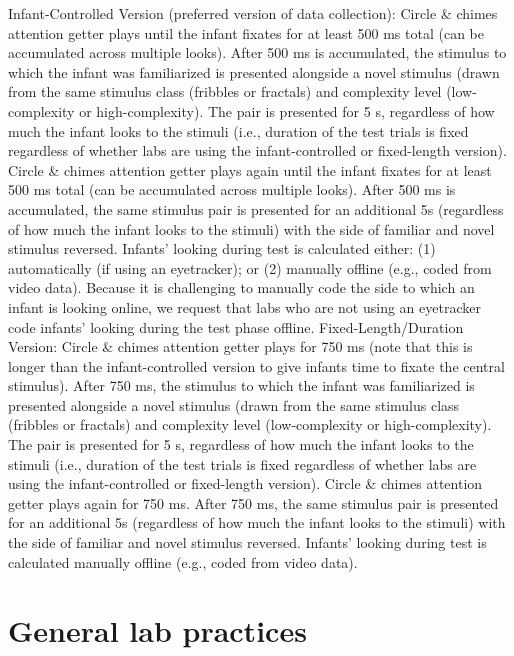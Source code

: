 \documentclass[
]{book}
\begin{document}
Infant-Controlled Version (preferred version of data collection):
Circle \& chimes attention getter plays until the infant fixates for at least 500 ms total (can be accumulated across multiple looks).
After 500 ms is accumulated, the stimulus to which the infant was familiarized is presented alongside a novel stimulus (drawn from the same stimulus class (fribbles or fractals) and complexity level (low-complexity or high-complexity). The pair is presented for 5 s, regardless of how much the infant looks to the stimuli (i.e., duration of the test trials is fixed regardless of whether labs are using the infant-controlled or fixed-length version).
Circle \& chimes attention getter plays again until the infant fixates for at least 500 ms total (can be accumulated across multiple looks).
After 500 ms is accumulated, the same stimulus pair is presented for an additional 5s (regardless of how much the infant looks to the stimuli) with the side of familiar and novel stimulus reversed.
Infants' looking during test is calculated either: (1) automatically (if using an eyetracker); or (2) manually offline (e.g., coded from video data). Because it is challenging to manually code the side to which an infant is looking online, we request that labs who are not using an eyetracker code infants' looking during the test phase offline.
Fixed-Length/Duration Version:
Circle \& chimes attention getter plays for 750 ms (note that this is longer than the infant-controlled version to give infants time to fixate the central stimulus).
After 750 ms, the stimulus to which the infant was familiarized is presented alongside a novel stimulus (drawn from the same stimulus class (fribbles or fractals) and complexity level (low-complexity or high-complexity). The pair is presented for 5 s, regardless of how much the infant looks to the stimuli (i.e., duration of the test trials is fixed regardless of whether labs are using the infant-controlled or fixed-length version).
Circle \& chimes attention getter plays again for 750 ms.
After 750 ms, the same stimulus pair is presented for an additional 5s (regardless of how much the infant looks to the stimuli) with the side of familiar and novel stimulus reversed.
Infants' looking during test is calculated manually offline (e.g., coded from video data).

\hypertarget{general-lab-practices}{%
\section{General lab practices}\label{general-lab-practices}}
\end{document}
